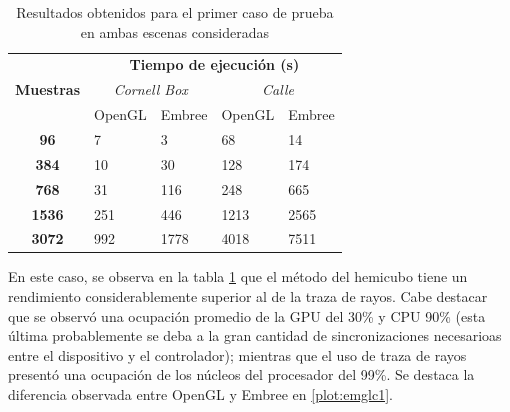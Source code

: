 \begin{table}[H]
	\label{tab:tablecaso1}
	\centering
	\begin{tabular}{|c|l|l|l|l|}
		\hline
		\multirow{3}{*}{\textbf{Muestras}} & \multicolumn{4}{c|}{\textbf{Tiempo de ejecución (s)}}                                                                                  \\ \cline{2-5} 
		& \multicolumn{2}{c|}{\textit{Cornell Box}}                 & \multicolumn{2}{c|}{\textit{Calle}}                      \\ \cline{2-5} 
		& \multicolumn{1}{c|}{OpenGL} & \multicolumn{1}{c|}{Embree} & \multicolumn{1}{c|}{OpenGL} & \multicolumn{1}{c|}{Embree} \\ \hline
		\textbf{96}                        & 7                           & 3                           & 68                          & 14                          \\ \hline
		\textbf{384}                       & 10                          & 30                          & 128                         & 174                         \\ \hline
		\textbf{768}                       & 31                          & 116                         & 248                         & 665                         \\ \hline
		\textbf{1536}                      & 251                         & 446                         & 1213                        & 2565                        \\ \hline
		\textbf{3072}                      & 992                         & 1778                        & 4018                        & 7511                        \\ \hline
	\end{tabular}
	\caption{Resultados obtenidos para el primer caso de prueba en ambas escenas consideradas}
\end{table}

En este caso, se observa en la tabla \ref{tab:tablecaso1} que el método del hemicubo tiene un rendimiento considerablemente superior al de la traza de rayos. Cabe destacar que se observó una ocupación promedio de la GPU del 30\% y CPU 90\% (esta última probablemente se deba a la gran cantidad de sincronizaciones necesarioas entre el dispositivo y el controlador); mientras que el uso de traza de rayos presentó una ocupación de los núcleos del procesador del 99\%. Se destaca la diferencia observada entre OpenGL y Embree en \ref{plot:emglc1}.

